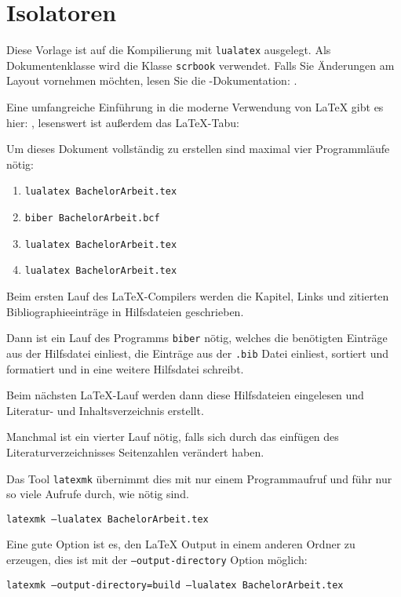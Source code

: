 \chapter{Isolatoren}\label{make}

Diese Vorlage ist auf die Kompilierung mit \texttt{lualatex} ausgelegt.
Als Dokumentenklasse  wird die \KOMAScript\-Klasse \texttt{scrbook} verwendet.
Falls Sie Änderungen am Layout vornehmen möchten, lesen Sie die \KOMAScript-Dokumentation: \cite{koma}.

Eine umfangreiche Einführung in die moderne Verwendung von \LaTeX{} gibt es hier: \cite{toolbox}, lesenswert ist außerdem das \LaTeX-Tabu: \cite{l2tabu}

Um dieses Dokument vollständig zu erstellen sind maximal vier Programmläufe nötig:
\begin{enumerate}[nosep]
    \item \texttt{lualatex BachelorArbeit.tex}
    \item \texttt{biber BachelorArbeit.bcf}
    \item \texttt{lualatex BachelorArbeit.tex}
    \item \texttt{lualatex BachelorArbeit.tex}
\end{enumerate}

Beim ersten Lauf des \LaTeX-Compilers werden die Kapitel, Links und zitierten Bibliographieeinträge in Hilfsdateien geschrieben.

Dann ist ein Lauf des Programms \texttt{biber} nötig, welches die benötigten Einträge aus der Hilfsdatei einliest, die Einträge aus der \texttt{.bib} Datei einliest, sortiert und formatiert und in eine weitere Hilfsdatei schreibt.

Beim nächsten \LaTeX-Lauf werden dann diese Hilfsdateien eingelesen und Literatur- und Inhaltsverzeichnis erstellt.

Manchmal ist ein vierter Lauf nötig, falls sich durch das einfügen des Literaturverzeichnisses Seitenzahlen verändert haben.

Das Tool \texttt{latexmk} übernimmt dies mit nur einem Programmaufruf und
führ nur so viele Aufrufe durch, wie nötig sind.

\texttt{latexmk --lualatex BachelorArbeit.tex}

Eine gute Option ist es, den \LaTeX{} Output in einem anderen
Ordner zu erzeugen, dies ist mit der \texttt{--output-directory} Option möglich:

\texttt{latexmk --output-directory=build --lualatex BachelorArbeit.tex}


